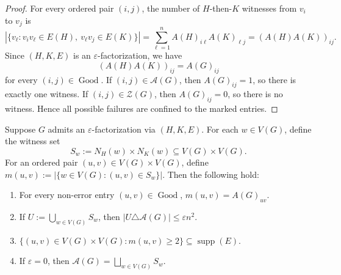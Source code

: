 \documentclass{file}
\newcommand{\eps}{\varepsilon}
\newcommand{\supp}{\operatorname{supp}}
\newcommand{\Good}{\operatorname{Good}}
\begin{document}
\begin{proof}
For every ordered pair $(i,j)$, the number of $H$-then-$K$ witnesses from
$v_i$ to $v_j$ is
\[
  |\{v_\ell: v_iv_\ell\in E(H),\ v_\ell v_j\in E(K)\}|
  =
  \sum_{\ell=1}^n A(H)_{i\ell}A(K)_{\ell j}
  =
  (A(H)A(K))_{ij}.
\]
Since $(H,K,E)$ is an $\eps$-factorization, we have
\[
  (A(H)A(K))_{ij}=A(G)_{ij}
\]
for every $(i,j)\in\Good$.  If $(i,j)\in\mathcal A(G)$, then
$A(G)_{ij}=1$, so there is exactly one witness.  If
$(i,j)\in\mathcal Z(G)$, then $A(G)_{ij}=0$, so there is no witness.  Hence
all possible failures are confined to the marked entries.
\end{proof}

\begin{thm}
\label{thm:biclique-localized}
Suppose $G$ admits an $\eps$-factorization via $(H,K,E)$.  For each $w\in V(G)$, define the witness set
\[
  S_w:=N_H(w)\times N_K(w)\subseteq V(G)\times V(G).
\]
For an ordered pair $(u,v)\in V(G)\times V(G)$, define
$m(u,v):= |\{w\in V(G):(u,v)\in S_w\}|$.
Then the following hold:
\begin{enumerate}
  \item For every non-error entry $(u,v)\in\Good$, $m(u,v)=A(G)_{uv}$.
  \item If $U:=\bigcup_{w\in V(G)} S_w$,
  then $|U\triangle \mathcal A(G)|\le \eps n^2$.

  \item $\{(u,v)\in V(G)\times V(G):m(u,v)\ge 2\}\subseteq \supp(E)$.
  \item If $\eps=0$, then $\mathcal A(G)=\bigsqcup_{w\in V(G)} S_w$.
\end{enumerate}
\end{thm}
\end{document}
